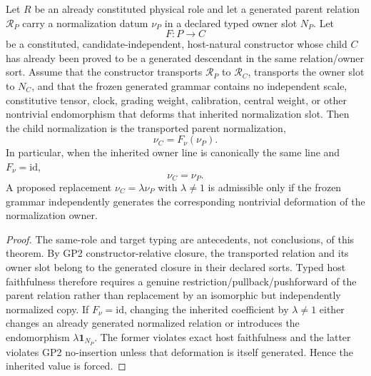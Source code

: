 \documentclass[12pt,a4paper]{article}
\begin{document}
\begin{theorem}
\label{p2:thm:gp2-generated-owner-normalization-inheritance}
Let \(R\) be an already constituted physical role and let a generated parent
relation \(\mathcal R_P\) carry a normalization datum \(\nu_P\) in a declared
typed owner slot \(N_P\).  Let
\[
 F:P\longrightarrow C
\]
be a constituted, candidate-independent, host-natural constructor whose child
\(C\) has already been proved to be a generated descendant in the same
relation/owner sort.  Assume that the constructor transports
\(\mathcal R_P\) to \(\mathcal R_C\), transports the owner slot to \(N_C\),
and that the frozen generated grammar contains no independent scale,
constitutive tensor, clock, grading weight, calibration, central weight, or
other nontrivial endomorphism that deforms that inherited normalization slot.
Then the child normalization is the transported parent normalization,
\[
 \boxed{\nu_C=F_\nu(\nu_P).}
\]
In particular, when the inherited owner line is canonically the same line and
\(F_\nu=\mathrm{id}\),
\[
 \boxed{\nu_C=\nu_P.}
\]
A proposed replacement \(\nu_C=\lambda\nu_P\) with \(\lambda\neq1\) is
admissible only if the frozen grammar independently generates the corresponding
nontrivial deformation of the normalization owner.
\end{theorem}

\begin{proof}
The same-role and target typing are antecedents, not conclusions, of this
theorem.  By GP2 constructor-relative closure, the transported relation and its
owner slot belong to the generated closure in their declared sorts.  Typed host
faithfulness therefore requires a genuine restriction/pullback/pushforward of
the parent relation rather than replacement by an isomorphic but independently
normalized copy.  If \(F_\nu=\mathrm{id}\), changing the inherited coefficient
by \(\lambda\neq1\) either changes an already generated normalized relation or
introduces the endomorphism \(\lambda\mathbf1_{N_P}\).  The former violates
exact host faithfulness and the latter violates GP2 no-insertion unless that
deformation is itself generated.  Hence the inherited value is forced.
\end{proof}
\end{document}
